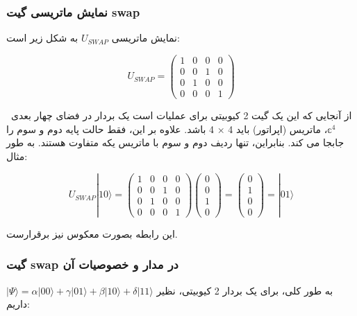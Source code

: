 \documentclass{book}
\begin{document}
\subsubsection{نمایش ماتریسی گیت swap}
نمایش ماتریسی $U_{S W A P}$ به شکل زیر است:
\begin{center}
	$$U_{S W A P}=\left(\begin{array}{llll}
		1 & 0 & 0 & 0 \\
		0 & 0 & 1 & 0 \\
		0 & 1 & 0 & 0 \\
		0 & 0 & 0 & 1
	\end{array}\right)$$
\end{center}
\
 از آنجایی که این یک گیت 2 کیوبیتی برای عملیات است یک بردار در فضای چهار بعدی $\mathbb{c}^4$، ماتریس (اپراتور) باید 4 × 4 باشد. علاوه بر این، فقط حالت پایه دوم و سوم را جابجا می کند. بنابراین، تنها ردیف دوم و سوم با ماتریس یکه متفاوت هستند. به طور مثال:
\begin{center}
	$$U_{S W A P}|10\rangle=\left(\begin{array}{llll}
		1 & 0 & 0 & 0 \\
		0 & 0 & 1 & 0 \\
		0 & 1 & 0 & 0 \\
		0 & 0 & 0 & 1
	\end{array}\right)\left(\begin{array}{l}
		0 \\
		0 \\
		1 \\
		0
	\end{array}\right)=\left(\begin{array}{l}
		0 \\
		1 \\
		0 \\
		0
	\end{array}\right)=|01\rangle$$
\end{center}
این رابطه‌ بصورت معکوس نیز برقرارست.

\subsubsection{گیت swap در مدار و خصوصیات آن}
به طور کلی، برای یک بردار 2 کیوبیتی، نظیر $\vert \Psi \rangle=\alpha|00\rangle+\gamma|01\rangle+\beta|10\rangle+\delta|11\rangle$ داریم:
\end{document}
